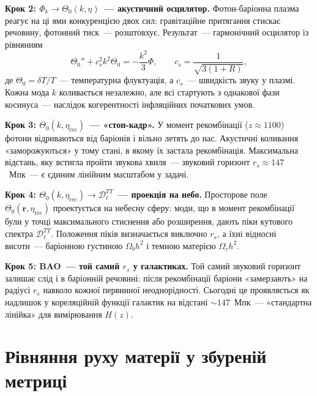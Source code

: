 \medskip
\noindent\textbf{Крок 2: $\Phi_k \to \Theta_0(k,\eta)$~--- акустичний осцилятор.}
Фотон-баріонна плазма реагує на ці ями конкуренцією двох сил:
гравітаційне притягання стискає речовину, фотонний тиск~---
розштовхує. Результат~--- гармонічний осцилятор із рівнянням
\[
\Theta_0'' + c_s^2 k^2\Theta_0 = -\frac{k^2}{3}\Phi,
\qquad
c_s = \frac{1}{\sqrt{3(1+R)}},
\]
де $\Theta_0 = \delta T/T$~--- температурна флуктуація, а
$c_s$~--- швидкість звуку у плазмі.
Кожна мода $k$ коливається незалежно, але всі стартують
з однакової фази косинуса~--- наслідок когерентності
інфляційних початкових умов.

\medskip
\noindent\textbf{Крок 3: $\Theta_0(k,\eta_{\text{rec}})$~--- «стоп-кадр».}
У момент рекомбінації ($z \approx 1100$) фотони відриваються
від баріонів і вільно летять до нас. Акустичні коливання
«заморожуються» у тому стані, в якому їх застала рекомбінація.
Максимальна відстань, яку встигла пройти звукова хвиля~---
звуковий горизонт $r_s \approx 147$~Мпк~--- є єдиним
лінійним масштабом у задачі.

\medskip
\noindent\textbf{Крок 4: $\Theta_0(k,\eta_{\text{rec}}) \to \mathcal{D}_\ell^{TT}$~--- проекція на небо.}
Просторове поле $\Theta_0(\mathbf{r},\eta_{\text{rec}})$ проектується
на небесну сферу: моди, що в момент рекомбінації були у точці
максимального стиснення або розширення, дають піки кутового
спектра $\mathcal{D}_\ell^{TT}$. Положення піків визначається
виключно $r_s$, а їхні відносні висоти~--- баріонною густиною
$\Omega_b h^2$ і темною матерією $\Omega_c h^2$.

\medskip
\noindent\textbf{Крок 5: BAO~--- той самий $r_s$ у галактиках.}
Той самий звуковий горизонт залишає слід і в баріонній
речовині: після рекомбінації баріони «замерзають» на
радіусі $r_s$ навколо кожної первинної неоднорідності.
Сьогодні це проявляється як надлишок у кореляційній
функції галактик на відстані $\sim 147$~Мпк~---
«стандартна лінійка» для вимірювання $H(z)$.


\section{Рівняння руху матерії у збуреній метриці}
\label{sec:matter_perturbations}

